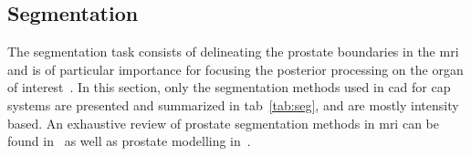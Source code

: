 \subsection{Segmentation} \label{subsec:segmentation}

The segmentation task consists of delineating the prostate boundaries in the \ac{mri} and is of particular importance for focusing the posterior processing on the organ of interest~\cite{Ghose2012}. In this section, only the segmentation methods used in \ac{cad} for \ac{cap} systems are presented and summarized in \ac{tab}~\ref{tab:seg}, and are mostly intensity based. An exhaustive review of prostate segmentation methods in \ac{mri} can be found in~\cite{Ghose2012} as well as prostate modelling in~\cite{Chilali2014}.

